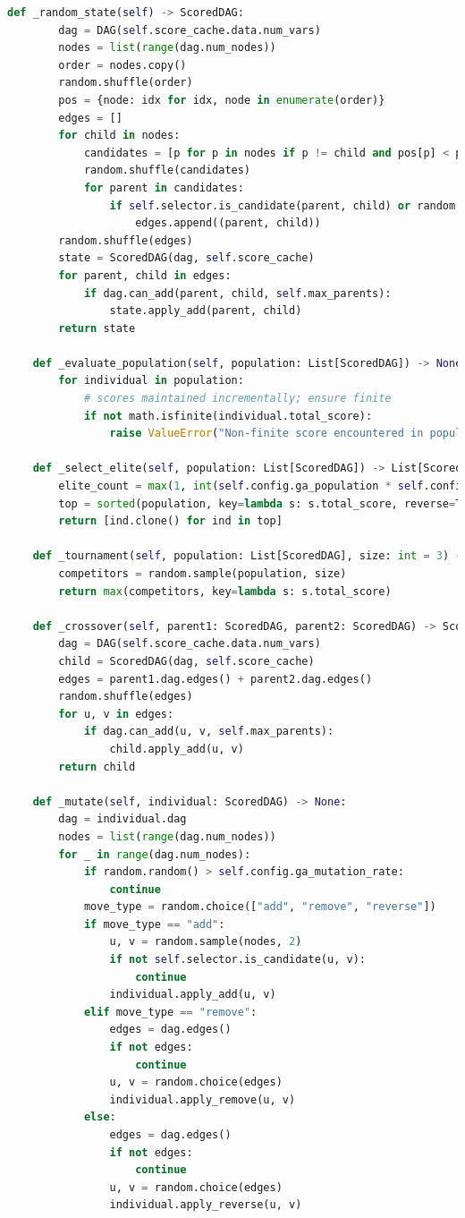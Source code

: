 \documentclass[twoside,11pt]{article}
\begin{document}
\begin{algorithm}
\begin{lstlisting}[language=Python]
    def _random_state(self) -> ScoredDAG:
        dag = DAG(self.score_cache.data.num_vars)
        nodes = list(range(dag.num_nodes))
        order = nodes.copy()
        random.shuffle(order)
        pos = {node: idx for idx, node in enumerate(order)}
        edges = []
        for child in nodes:
            candidates = [p for p in nodes if p != child and pos[p] < pos[child]]
            random.shuffle(candidates)
            for parent in candidates:
                if self.selector.is_candidate(parent, child) or random.random() < 0.1:
                    edges.append((parent, child))
        random.shuffle(edges)
        state = ScoredDAG(dag, self.score_cache)
        for parent, child in edges:
            if dag.can_add(parent, child, self.max_parents):
                state.apply_add(parent, child)
        return state

    def _evaluate_population(self, population: List[ScoredDAG]) -> None:
        for individual in population:
            # scores maintained incrementally; ensure finite
            if not math.isfinite(individual.total_score):
                raise ValueError("Non-finite score encountered in population.")

    def _select_elite(self, population: List[ScoredDAG]) -> List[ScoredDAG]:
        elite_count = max(1, int(self.config.ga_population * self.config.ga_elite_frac))
        top = sorted(population, key=lambda s: s.total_score, reverse=True)[:elite_count]
        return [ind.clone() for ind in top]

    def _tournament(self, population: List[ScoredDAG], size: int = 3) -> ScoredDAG:
        competitors = random.sample(population, size)
        return max(competitors, key=lambda s: s.total_score)

    def _crossover(self, parent1: ScoredDAG, parent2: ScoredDAG) -> ScoredDAG:
        dag = DAG(self.score_cache.data.num_vars)
        child = ScoredDAG(dag, self.score_cache)
        edges = parent1.dag.edges() + parent2.dag.edges()
        random.shuffle(edges)
        for u, v in edges:
            if dag.can_add(u, v, self.max_parents):
                child.apply_add(u, v)
        return child

    def _mutate(self, individual: ScoredDAG) -> None:
        dag = individual.dag
        nodes = list(range(dag.num_nodes))
        for _ in range(dag.num_nodes):
            if random.random() > self.config.ga_mutation_rate:
                continue
            move_type = random.choice(["add", "remove", "reverse"])
            if move_type == "add":
                u, v = random.sample(nodes, 2)
                if not self.selector.is_candidate(u, v):
                    continue
                individual.apply_add(u, v)
            elif move_type == "remove":
                edges = dag.edges()
                if not edges:
                    continue
                u, v = random.choice(edges)
                individual.apply_remove(u, v)
            else:
                edges = dag.edges()
                if not edges:
                    continue
                u, v = random.choice(edges)
                individual.apply_reverse(u, v)


\end{lstlisting}
\end{algorithm}
\end{document}
